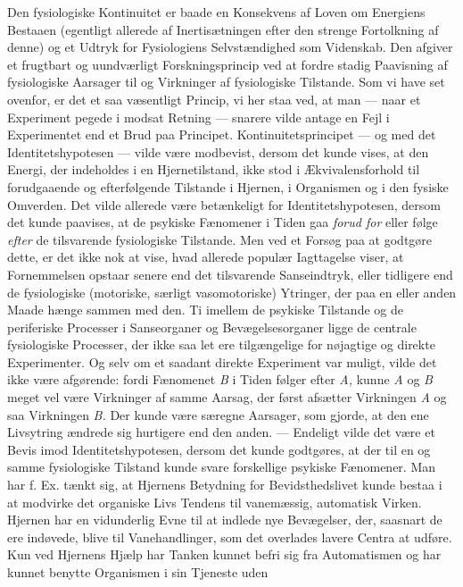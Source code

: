 \documentclass[12pt,a4paper,openany]{book}
\newcommand{\opage}[1]{\marginnote{\footnotesize\textit{[#1]}}}
\begin{document}
\opage{23}Den fysiologiske Kontinuitet er baade en Konsekvens af Loven om
Energiens Bestaaen (egentligt allerede af Inertisætningen efter den strenge
Fortolkning af denne) og et Udtryk for Fysiologiens Selvstændighed som
Videnskab. Den afgiver et frugtbart og uundværligt Forskningsprincip ved at
fordre stadig Paavisning af fysiologiske Aarsager til og Virkninger af
fysiologiske Tilstande. Som vi have set ovenfor, er det et saa væsentligt
Princip, vi her staa ved, at man --- naar et Experiment pegede i modsat Retning
--- snarere vilde antage en Fejl i Experimentet end et Brud paa Principet.
Kontinuitetsprincipet --- og med det Identitetshypotesen --- vilde være
modbevist, dersom det kunde vises, at den Energi, der indeholdes i en
Hjernetilstand, ikke stod i Ækvivalensforhold til forudgaaende og efterfølgende
Tilstande i Hjernen, i Organismen og i den fysiske Omverden. Det vilde allerede
være betænkeligt for Identitetshypotesen, dersom det kunde paavises, at de
psykiske Fænomener i Tiden gaa \textit{forud for} eller følge \textit{efter} de
tilsvarende fysiologiske Tilstande. Men ved et Forsøg paa at godtgøre dette, er
det ikke nok at vise, hvad allerede populær Iagttagelse viser, at Fornemmelsen
opstaar senere end det tilsvarende Sanseindtryk, eller tidligere end de
fysiologiske (motoriske, særligt vasomotoriske) Ytringer, der paa en eller
anden Maade hænge sammen med den. Ti imellem de psykiske Tilstande og de
periferiske Processer i Sanseorganer og Bevægelsesorganer ligge de centrale
fysiologiske Processer, der ikke saa let ere tilgængelige for nøjagtige og
direkte Experimenter. Og selv om et saadant direkte Experiment var muligt,
vilde det ikke være afgørende: fordi Fænomenet \textit{B} i Tiden følger efter
\textit{A,} kunne \textit{A} og \textit{B} meget vel være Virkninger af samme
Aarsag, der først afsætter Virkningen \textit{A} og saa Virkningen \textit{B.}
Der kunde være særegne Aarsager, som gjorde, at den ene Livsytring ændrede sig
hurtigere end den anden. --- Endeligt vilde det være et Bevis imod
Identitetshypotesen, dersom det kunde godtgøres, at der til en og samme
fysiologiske Tilstand kunde svare forskellige psykiske Fænomener. Man har f.
Ex. tænkt sig, at Hjernens Betydning for Bevidsthedslivet kunde bestaa i at
modvirke det organiske Livs Tendens til vanemæssig, automatisk
\opage{24}Virken. Hjernen har en vidunderlig Evne til at indlede nye
Bevægelser, der, saasnart de ere indøvede, blive til Vanehandlinger, som det
overlades lavere Centra at udføre. Kun ved Hjernens Hjælp har Tanken kunnet
befri sig fra Automatismen og har kunnet benytte Organismen i sin Tjeneste uden
\end{document}
